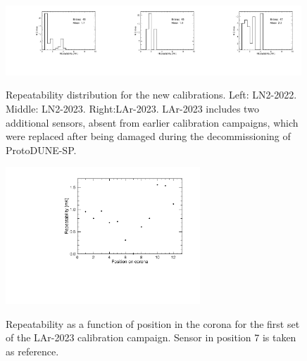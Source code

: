 \begin{figure}[htbp]
    \centering
    {\includegraphics[width=0.33\textwidth]{images/figure_19_a.pdf}}{\includegraphics[width=0.33\textwidth]{images/figure_19_b.pdf}}{\includegraphics[width=0.33\textwidth]{images/figure_19_c.pdf}}
    \caption{Repeatability distribution for the new calibrations. Left: LN2-2022. Middle: LN2-2023. Right:LAr-2023. LAr-2023 includes two additional sensors, absent from earlier calibration campaigns, which were replaced after being damaged during the decommissioning of ProtoDUNE-SP.}
    \label{fig:newCalib_stat}
    \end{figure}

\begin{figure}[htbp]
\centering
{\includegraphics[width=0.65\textwidth]{images/figure_20.pdf}}
\caption{Repeatability as a function of position in the corona for the first set of the LAr-2023 calibration campaign. Sensor in position 7 is taken as reference.}
\label{fig:newCalib_statVsChannel}
\end{figure}

